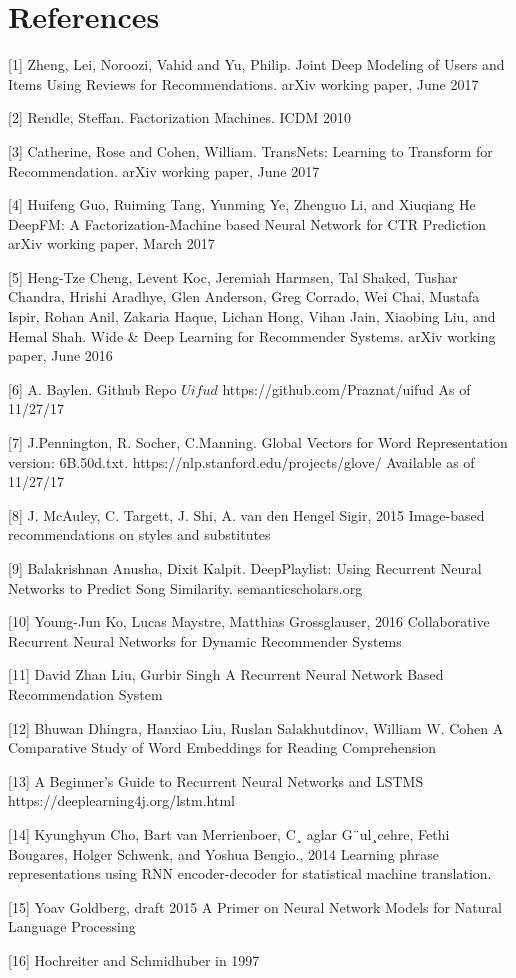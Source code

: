 \documentclass[10pt,twocolumn,letterpaper]{article}
\begin{document}
\section{References}

[1] Zheng, Lei, Noroozi, Vahid and Yu, Philip. 
Joint Deep Modeling of Users and Items Using Reviews for Recommendations. arXiv working paper, June 2017

[2] Rendle, Steffan. 
Factorization Machines. ICDM 2010

[3] Catherine, Rose and Cohen, William. 
TransNets: Learning to Transform for Recommendation. arXiv working paper, June 2017

[4] Huifeng Guo, Ruiming Tang, Yunming Ye, Zhenguo Li, and Xiuqiang He
DeepFM: A Factorization-Machine based Neural Network for CTR Prediction
arXiv working paper, March 2017

[5] Heng-Tze Cheng, Levent Koc, Jeremiah Harmsen, Tal Shaked, Tushar Chandra, Hrishi Aradhye, Glen Anderson, Greg Corrado, Wei Chai, Mustafa Ispir, Rohan Anil, Zakaria Haque, Lichan Hong, Vihan Jain, Xiaobing Liu, and Hemal Shah.
Wide \& Deep Learning for Recommender Systems. arXiv working paper, June 2016

[6] A. Baylen. Github Repo $Uifud$
https://github.com/Praznat/uifud
As of 11/27/17 

[7] J.Pennington, R. Socher, C.Manning. 
Global Vectors for Word Representation version: 6B.50d.txt. 
https://nlp.stanford.edu/projects/glove/ 
Available as of 11/27/17 

[8] J. McAuley, C. Targett, J. Shi, A. van den Hengel Sigir, 2015
Image-based recommendations on styles and substitutes

[9] Balakrishnan Anusha, Dixit Kalpit. 
DeepPlaylist: Using Recurrent Neural Networks to Predict Song Similarity. semanticscholars.org 

[10] Young-Jun Ko, Lucas Maystre, Matthias Grossglauser, 2016
Collaborative Recurrent Neural Networks for Dynamic Recommender Systems
 
[11] David Zhan Liu, Gurbir Singh
A Recurrent Neural Network Based Recommendation System

[12] Bhuwan Dhingra, Hanxiao Liu, Ruslan Salakhutdinov, William W. Cohen
A Comparative Study of Word Embeddings for Reading Comprehension

[13] A Beginner's Guide to Recurrent Neural Networks and LSTMS
https://deeplearning4j.org/lstm.html

[14] Kyunghyun Cho, Bart van Merrienboer, C¸ aglar G¨ul¸cehre, Fethi Bougares, Holger Schwenk, and Yoshua Bengio., 2014 
Learning phrase representations using RNN encoder-decoder for statistical machine translation.

[15] Yoav Goldberg, draft 2015
A Primer on Neural Network Models for Natural Language Processing

[16] Hochreiter and Schmidhuber in 1997
\end{document}

